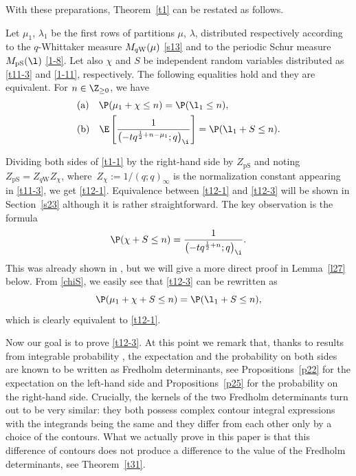 With these preparations, Theorem~\ref{t1} can be restated as follows.
 \begin{Theorem} \label{thm:intro_prob}\label{t12}
 Let $\mu_1$, $\lambda_1$ be the first rows of partitions $\mu$, $\lambda$, distributed respectively according to the $q$-Whittaker measure $M_{q{\rm W}}(\mu)$ \eqref{s13} and to the periodic Schur measure $M_{{\rm pS}}(\l)$ \eqref{1-8}. Let also $\chi$ and $S$ be independent random variables distributed as \eqref{t11-3} and \eqref{1-11}, respectively.
 The following equalities hold and they are equivalent. For $n\in\Z_{\ge 0}$,
 we have
 \begin{align}
 \label{t12-1}
& {\rm (a)}\quad \P (\mu_1+\chi\le n )=
 \P (\l_1\le n ),
\\
\label{t12-3} & {\rm (b)} \quad
 \E\left[\frac{1}{\bigl(-t q^{\frac12+n-\mu_1};q\bigr)_{\i}}\right]
 =
 \P(\l_1+S\le n).
\end{align}
\end{Theorem}
 Dividing both sides of \eqref{t1-1} by the right-hand side by $Z_{\textrm{pS}}$ and noting $Z_{\textrm{pS}}=Z_{q\textrm{W}}Z_{\chi}$, where~${Z_{\chi}:=1/(q;q)_{\infty}}$ is the normalization constant appearing in \eqref{t11-3}, we get \eqref{t12-1}.
 Equivalence between \eqref{t12-1} and \eqref{t12-3} will be shown in Section~\ref{s23} although it is rather straightforward.
 The key observation is the formula
 \begin{align}
 \label{chiS}
 \P(\chi+S\le n)
 =
 \frac{1}{\bigl(-t q^{\frac12+n};q\bigr)_{\i}}.
 \end{align}
 This was already shown in \cite[Section 2]{BeteaBouttier2019PeriodicSchur}, but we will give a more direct proof in Lemma~\ref{l27} below. From \eqref{chiS}, we easily see that \eqref{t12-3} can be rewritten as{\samepage
 \[\P(\mu_1+\chi+S\le n)
 =
 \P(\l_1+S\le n),\]
 which is clearly equivalent to \eqref{t12-1}.}

 Now our goal is to prove \eqref{t12-3}. At this point we remark that, thanks to results from integrable probability \cite{Borodin2007PeriodicSchur,ImamuraSasamoto2019qTASEPtheta}, the expectation and the probability on both sides are known to be written as Fredholm determinants, see Propositions~\ref{p22} for the expectation on the left-hand side and Propositions~\ref{p25} for the probability on the right-hand side.
 Crucially, the kernels of the two Fredholm determinants turn out to be very similar: they both possess complex contour integral expressions with the integrands
 being the same and
 they differ from each other only by a choice of the contours.
 What we actually prove in this paper is that this difference of contours does not produce a difference to the value of the Fredholm determinants, see Theorem~\ref{t31}.


